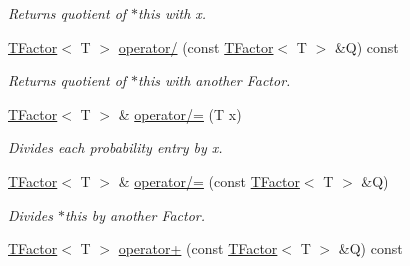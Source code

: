 \begin{CompactItemize}
\begin{CompactList}\small\item\em Returns quotient of $\ast$this with x. \item\end{CompactList}\item 
\hypertarget{classdai_1_1TFactor_f5894eb556d2c440774e650102207d80}{
\hyperlink{classdai_1_1TFactor}{TFactor}$<$ T $>$ \hyperlink{classdai_1_1TFactor_f5894eb556d2c440774e650102207d80}{operator/} (const \hyperlink{classdai_1_1TFactor}{TFactor}$<$ T $>$ \&Q) const }
\label{classdai_1_1TFactor_f5894eb556d2c440774e650102207d80}

\begin{CompactList}\small\item\em Returns quotient of $\ast$this with another Factor. \item\end{CompactList}\item 
\hypertarget{classdai_1_1TFactor_45c34bf15cc9b37e5c0718d96d9d2c1a}{
\hyperlink{classdai_1_1TFactor}{TFactor}$<$ T $>$ \& \hyperlink{classdai_1_1TFactor_45c34bf15cc9b37e5c0718d96d9d2c1a}{operator/=} (T x)}
\label{classdai_1_1TFactor_45c34bf15cc9b37e5c0718d96d9d2c1a}

\begin{CompactList}\small\item\em Divides each probability entry by x. \item\end{CompactList}\item 
\hypertarget{classdai_1_1TFactor_c5ac7c898b536ecbed7a1f58e3899cdb}{
\hyperlink{classdai_1_1TFactor}{TFactor}$<$ T $>$ \& \hyperlink{classdai_1_1TFactor_c5ac7c898b536ecbed7a1f58e3899cdb}{operator/=} (const \hyperlink{classdai_1_1TFactor}{TFactor}$<$ T $>$ \&Q)}
\label{classdai_1_1TFactor_c5ac7c898b536ecbed7a1f58e3899cdb}

\begin{CompactList}\small\item\em Divides $\ast$this by another Factor. \item\end{CompactList}\item 
\hypertarget{classdai_1_1TFactor_5db00c03b427e577bab01646c451ae23}{
\hyperlink{classdai_1_1TFactor}{TFactor}$<$ T $>$ \hyperlink{classdai_1_1TFactor_5db00c03b427e577bab01646c451ae23}{operator+} (const \hyperlink{classdai_1_1TFactor}{TFactor}$<$ T $>$ \&Q) const }
\label{classdai_1_1TFactor_5db00c03b427e577bab01646c451ae23}


\end{CompactItemize}
